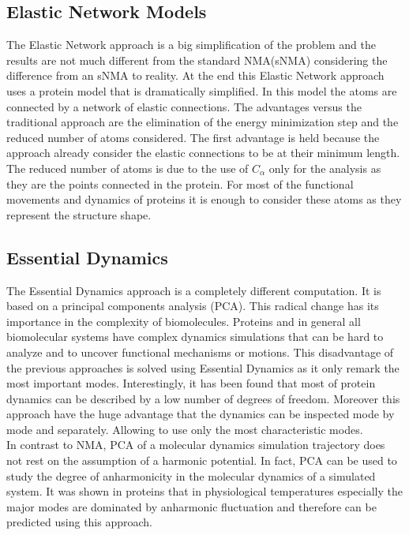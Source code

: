 \documentclass[12pt]{article}
\begin{document}
\subsection{Elastic Network Models}
The Elastic Network\citep{Tirion1996} approach is a big simplification of the problem and the results are not much different from the standard NMA(sNMA) considering the difference from an sNMA to reality. At the end this Elastic Network approach uses a protein model that is dramatically simplified. In this model the atoms are connected by a network of elastic connections. The advantages versus the traditional approach are the elimination of the energy minimization step and the reduced number of atoms considered. The first advantage is held because the approach already consider the elastic connections to be at their minimum length. The reduced number of atoms is due to the use of $C_{\alpha}$ only for the analysis as they are the points connected in the protein. For most of the functional movements and dynamics of proteins it is enough to consider these atoms as they represent the structure shape.\citep{Hayward2008}\\

\subsection{Essential Dynamics}
The Essential Dynamics approach\citep{Amadei1993} is a completely different computation. It is based on a principal components analysis (PCA). This radical change has its importance in the complexity of biomolecules. Proteins and in general all biomolecular systems have complex dynamics simulations that can be hard to analyze and to uncover functional mechanisms or motions. This disadvantage of the previous approaches is solved using Essential Dynamics as it only remark the most important modes.  Interestingly, it has been found that most of protein dynamics can be described by a low number of degrees of freedom. Moreover this approach have the huge advantage that the dynamics can be inspected mode by mode and separately. Allowing  to use only the most characteristic modes.\\ 

In contrast to NMA, PCA of a molecular dynamics simulation trajectory does not rest on the assumption of a harmonic potential. In fact, PCA can be used to study the degree of anharmonicity in the molecular dynamics of a simulated system. It was shown in proteins that in physiological temperatures especially the major modes are dominated by anharmonic fluctuation and therefore can be predicted using this approach\citep{Amadei1993}.\\
\end{document}
